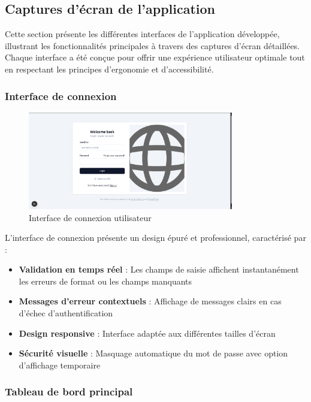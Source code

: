 \documentclass[12pt]{rapportPfe}
\begin{document}
\subsection{Captures d'écran de l'application}

Cette section présente les différentes interfaces de l'application développée, illustrant les fonctionnalités principales à travers des captures d'écran détaillées. Chaque interface a été conçue pour offrir une expérience utilisateur optimale tout en respectant les principes d'ergonomie et d'accessibilité.

\subsubsection{Interface de connexion}

\begin{figure}[H]
    \centering
    \includegraphics[width=0.8\textwidth]{diagrams/a_ss_02.png}
    \caption{Interface de connexion utilisateur}
    \label{fig:login}
\end{figure}

L'interface de connexion présente un design épuré et professionnel, caractérisé par :
\begin{itemize}
    \item \textbf{Validation en temps réel} : Les champs de saisie affichent instantanément les erreurs de format ou les champs manquants
    \item \textbf{Messages d'erreur contextuels} : Affichage de messages clairs en cas d'échec d'authentification
    \item \textbf{Design responsive} : Interface adaptée aux différentes tailles d'écran
    \item \textbf{Sécurité visuelle} : Masquage automatique du mot de passe avec option d'affichage temporaire
\end{itemize}

\subsubsection{Tableau de bord principal}
\end{document}
